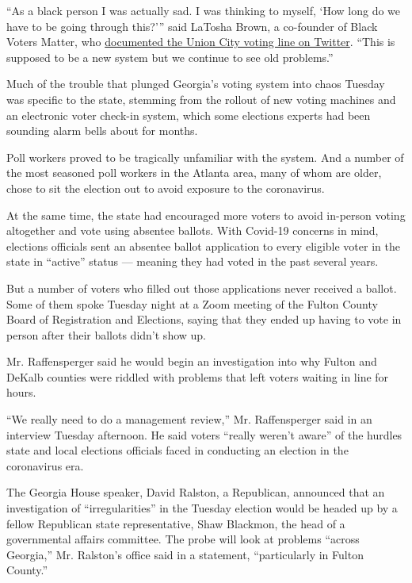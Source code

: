 ``As a black person I was actually sad. I was thinking to myself, `How
long do we have to be going through this?''' said LaTosha Brown, a
co-founder of Black Voters Matter, who
\href{https://twitter.com/MsLaToshaBrown/status/1270674550980739073?s=20}{documented
the Union City voting line on Twitter}. ``This is supposed to be a new
system but we continue to see old problems.''

Much of the trouble that plunged Georgia's voting system into chaos
Tuesday was specific to the state, stemming from the rollout of new
voting machines and an electronic voter check-in system, which some
elections experts had been sounding alarm bells about for months.

Poll workers proved to be tragically unfamiliar with the system. And a
number of the most seasoned poll workers in the Atlanta area, many of
whom are older, chose to sit the election out to avoid exposure to the
coronavirus.

At the same time, the state had encouraged more voters to avoid
in-person voting altogether and vote using absentee ballots. With
Covid-19 concerns in mind, elections officials sent an absentee ballot
application to every eligible voter in the state in ``active'' status
--- meaning they had voted in the past several years.

But a number of voters who filled out those applications never received
a ballot. Some of them spoke Tuesday night at a Zoom meeting of the
Fulton County Board of Registration and Elections, saying that they
ended up having to vote in person after their ballots didn't show up.

Mr. Raffensperger said he would begin an investigation into why Fulton
and DeKalb counties were riddled with problems that left voters waiting
in line for hours.

``We really need to do a management review,'' Mr. Raffensperger said in
an interview Tuesday afternoon. He said voters ``really weren't aware''
of the hurdles state and local elections officials faced in conducting
an election in the coronavirus era.

The Georgia House speaker, David Ralston, a Republican, announced that
an investigation of ``irregularities'' in the Tuesday election would be
headed up by a fellow Republican state representative, Shaw Blackmon,
the head of a governmental affairs committee. The probe will look at
problems ``across Georgia,'' Mr. Ralston's office said in a statement,
``particularly in Fulton County.''


